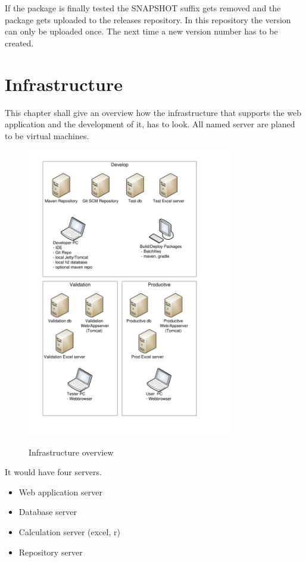 \documentclass[paper=a4,twoside=false,BCOR=0mm,DIV=calc,fontsize=12pt]{scrartcl}
\begin{document}
If the package is finally tested the SNAPSHOT suffix gets removed and the package gets uploaded to the releases repository. In this repository the version can only be uploaded once. The next time a new version number has to be created.

\section{Infrastructure}
This chapter shall give an overview how the infrastructure that supports the web application and the development of it, has to look. 
All named server are planed to be virtual machines.

\begin{figure}
    \begin{center}
       \includegraphics[width=0.8\textwidth]{./img/InfrastructureLayout.pdf}\\
    \end{center}
  \caption{Infrastructure overview}
  \label{infrastructureoverview}
\end{figure} 

It would have four servers. 
\begin{itemize}
 \item Web application server
 \item Database server
 \item Calculation server (excel, r)
 \item Repository server
\end{itemize}
\end{document}
